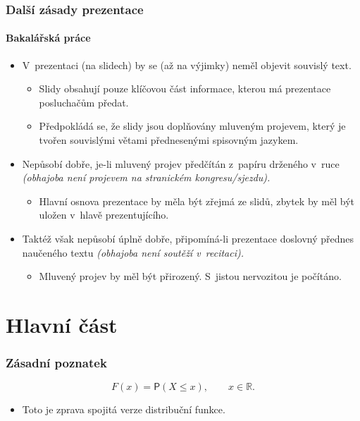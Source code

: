 \documentclass[c, 10pt]{beamer}
\begin{document}
\begin{frame}\frametitle{Další zásady prezentace}
\framesubtitle{Bakalářská práce}

\begin{itemize}\itemsep=1em
\item V~prezentaci (na slidech) by se (až na výjimky) neměl objevit souvislý text.
  \begin{itemize}\color{colTwo}\itemsep=1ex
  \item Slidy obsahují pouze klíčovou část informace, kterou má prezentace posluchačům předat.
  \item Předpokládá se, že slidy jsou doplňovány mluveným projevem, který je tvořen
   \alert{souvislými} větami přednesenými \alert{spisovným} jazykem. 
  \end{itemize}
\item Nepůsobí dobře, je-li mluvený projev předčítán z~papíru drženého v~ruce
   \textit{(obhajoba není projevem na stranickém kongresu/sjezdu).}
  \begin{itemize}\color{colTwo}
  \item Hlavní osnova prezentace by měla být zřejmá ze slidů, zbytek by měl být uložen
    v~hlavě prezentujícího. 
  \end{itemize}
\item Taktéž však nepůsobí úplně dobře, připomíná-li prezentace doslovný přednes naučeného textu
   \textit{(obhajoba není soutěží v~recitaci).}
  \begin{itemize}\color{colTwo}
  \item Mluvený projev by měl být přirozený. S~jistou nervozitou je počítáno.
  \end{itemize}
\end{itemize}
\end{frame}


\section{Hlavní část}

\begin{frame}\frametitle{Zásadní poznatek}

\begin{displaymath}
F(x) = \mathsf{P}(X \leq x),\qquad x\in\mathbb{R}.
\end{displaymath}
\begin{itemize}
\item Toto je \alert{zprava} spojitá verze distribuční funkce.
\end{itemize}
\end{frame}
\end{document}
